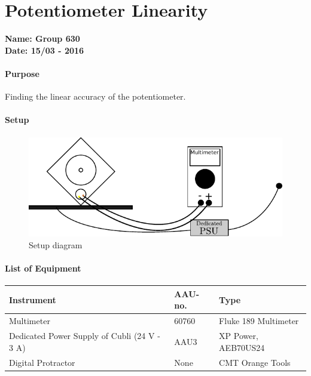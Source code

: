 \chapter{Potentiometer Linearity}\label{app:potentiometerLin} 
\textbf{Name: Group 630}\\
\textbf{Date: 15/03 - 2016}

\subsubsection{Purpose}
Finding the linear accuracy of the potentiometer.

\subsubsection{Setup}
\begin{figure}[H]
	\centering
	\includegraphics[scale=1]{figures/LabSetupLinearityTest.pdf}
	\caption{Setup diagram}
	\label{LabSetupRangeTest}
\end{figure}\vspace{-5mm}

\subsubsection{List of Equipment}
\begin{table}[H]
	\begin{tabular}{|l|l|p{4.3cm}|}
		\hline%
		\textbf{Instrument}                                  &  \textbf{AAU-no.}  &  \textbf{Type}                       \\
		\hline%
		Multimeter                                           &  60760           &  Fluke 189 Multimeter		                   \\
		\hline%
		Dedicated Power Supply of Cubli \small{(24 V - 3 A)} &  AAU3                   &  XP Power, AEB70US24                 \\
		\hline%
		Digital Protractor                                   &  None               & CMT Orange Tools     \\
		\hline%
	\end{tabular}
\end{table}

